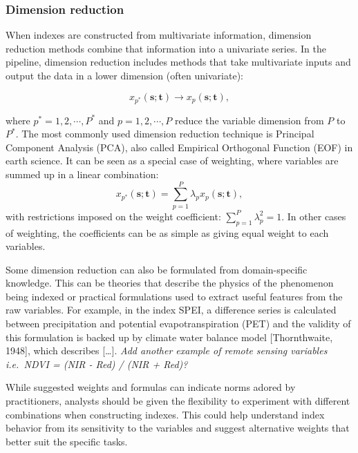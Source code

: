 \documentclass[
]{interact}
\begin{document}
\newpage

\hypertarget{dimension-reduction}{%
\subsubsection{Dimension reduction}\label{dimension-reduction}}

When indexes are constructed from multivariate information, dimension
reduction methods combine that information into a univariate series. In
the pipeline, dimension reduction includes methods that take
multivariate inputs and output the data in a lower dimension (often
univariate):

\begin{equation}
x_{p^*}(\mathbf{s}; \mathbf{t}) \rightarrow x_p(\mathbf{s}; \mathbf{t}),
\end{equation}

where \(p^* = 1, 2, \cdots, P^*\) and \(p = 1, 2, \cdots, P\) reduce the
variable dimension from \(P\) to \(P^*\). The most commonly used
dimension reduction technique is Principal Component Analysis (PCA),
also called Empirical Orthogonal Function (EOF) in earth science. It can
be seen as a special case of weighting, where variables are summed up in
a linear combination:
\[x_{p^*}(\mathbf{s}; \mathbf{t}) = \sum_{p = 1}^{P}\lambda_{p}x_p(\mathbf{s};\mathbf{t}),\]
with restrictions imposed on the weight coefficient:
\(\sum_{p=1}^P\lambda_p^2 = 1\). In other cases of weighting, the
coefficients can be as simple as giving equal weight to each variables.

Some dimension reduction can also be formulated from domain-specific
knowledge. This can be theories that describe the physics of the
phenomenon being indexed or practical formulations used to extract
useful features from the raw variables. For example, in the index SPEI,
a difference series is calculated between precipitation and potential
evapotranspiration (PET) and the validity of this formulation is backed
up by climate water balance model {[}Thornthwaite, 1948{]}, which
describes {[}\ldots{]}. \emph{Add another example of remote sensing
variables i.e.~NDVI = (NIR - Red) / (NIR + Red)?}

While suggested weights and formulas can indicate norms adored by
practitioners, analysts should be given the flexibility to experiment
with different combinations when constructing indexes. This could help
understand index behavior from its sensitivity to the variables and
suggest alternative weights that better suit the specific tasks.
\end{document}
